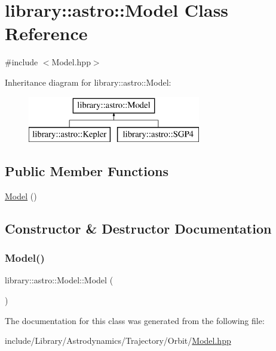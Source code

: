 \hypertarget{classlibrary_1_1astro_1_1_model}{}\section{library\+:\+:astro\+:\+:Model Class Reference}
\label{classlibrary_1_1astro_1_1_model}


{\ttfamily \#include $<$Model.\+hpp$>$}

Inheritance diagram for library\+:\+:astro\+:\+:Model\+:\begin{figure}[H]
\begin{center}
\leavevmode
\includegraphics[height=2.000000cm]{classlibrary_1_1astro_1_1_model}
\end{center}
\end{figure}
\subsection*{Public Member Functions}
\begin{DoxyCompactItemize}
\item 
\hyperlink{classlibrary_1_1astro_1_1_model_ad68fa2e75ec873aa8aa2ca136433f59d}{Model} ()
\end{DoxyCompactItemize}


\subsection{Constructor \& Destructor Documentation}
\mbox{\label{classlibrary_1_1astro_1_1_model_ad68fa2e75ec873aa8aa2ca136433f59d}} 
\subsubsection{\texorpdfstring{Model()}{Model()}}
{\footnotesize\ttfamily library\+::astro\+::\+Model\+::\+Model (\begin{DoxyParamCaption}{ }\end{DoxyParamCaption})}



The documentation for this class was generated from the following file\+:\begin{DoxyCompactItemize}
\item 
include/\+Library/\+Astrodynamics/\+Trajectory/\+Orbit/\hyperlink{_model_8hpp}{Model.\+hpp}\end{DoxyCompactItemize}
